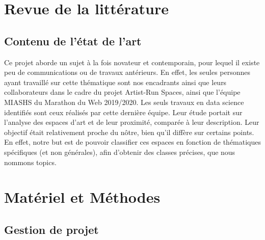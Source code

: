 \documentclass[mstat,12pt]{unswthesis}
\begin{document}
\hypertarget{revue-de-la-littuxe9rature}{%
\chapter{Revue de la littérature}\label{revue-de-la-littuxe9rature}}
\vspace{4 cm}
\hypertarget{contenu-de-luxe9tat-de-lart}{%
\section{Contenu de l'état de l'art}\label{contenu-de-luxe9tat-de-lart}}

Ce projet aborde un sujet à la fois novateur et contemporain, pour lequel il existe peu de communications ou de travaux antérieurs. En effet, les seules personnes ayant travaillé sur cette thématique sont nos encadrants ainsi que leurs collaborateurs dans le cadre du projet Artist-Run Spaces, ainsi que l’équipe MIASHS du Marathon du Web 2019/2020.
\vspace{1 cm}
Les seuls travaux en data science identifiés sont ceux réalisés par cette dernière équipe.
Leur étude portait sur l’analyse des espaces d’art et de leur proximité, comparée à leur description. Leur objectif était relativement proche du nôtre, bien qu’il diffère sur certains points. En effet, notre but est de pouvoir classifier ces espaces en fonction de thématiques spécifiques (et non générales), afin d’obtenir des classes précises, que nous nommons topics.

\hypertarget{matuxe9riel-et-muxe9thodes}{%
\chapter{Matériel et Méthodes}\label{matuxe9riel-et-muxe9thodes}}

\hypertarget{Gestion de projet}{%
\section{Gestion de projet}\label{Gestion de projet}}
\end{document}
